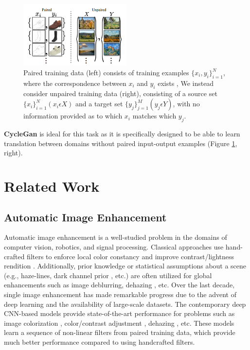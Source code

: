 \documentclass[a4paper]{article}
\begin{document}
\begin{figure}[H]
  \centering
  \includegraphics[width=0.5\textwidth]{paired_unpaired.png}
  \caption{Paired training data (left) consists of training examples $\{x_i, y_i\}_{i=1}^N$, where the correspondence between $x_i$ and $y_i$ exists \cite{isola2018imagetoimage}, We instead consider unpaired training data (right), consisting of a source set $\{x_i\}_{i=1}^N (x_i \epsilon X)$ and a target set $\{y_j\}_{j=1}^M (y_j \epsilon Y)$, with no information provided as to which $x_i$ matches which $y_j$.}
  \label{fig:datasetexample}
\end{figure}

\textbf{CycleGan} is ideal for this task as it is specifically designed to be able to learn translation between domains without paired input-output examples (Figure \ref{fig:datasetexample}, right).

\section{Related Work}
\subsection{Automatic Image Enhancement}
Automatic image enhancement is a well-studied problem in the domains of computer vision, robotics, and signal processing. Classical approaches use hand-crafted filters to enforce local color constancy and improve contrast/lightness rendition \cite{10.1117/1.1636183}. Additionally, prior knowledge or statistical assumptions about a scene (e.g., haze-lines, dark channel prior \cite{berman2019underwater}, etc.) are often utilized for global enhancements such as image deblurring, dehazing \cite{5567108}, etc. Over the last decade, single image enhancement has made remarkable progress due to the advent of deep learning and the availability of large-scale datasets. The contemporary deep CNN-based models provide state-of-the-art performance for problems such as image colorization \cite{zhang2016colorful}, color/contrast adjustment \cite{cheng2016deep}, dehazing \cite{7539399}, etc. These models learn a sequence of non-linear filters from paired training data, which provide much better performance compared to using handcrafted filters.
\end{document}
